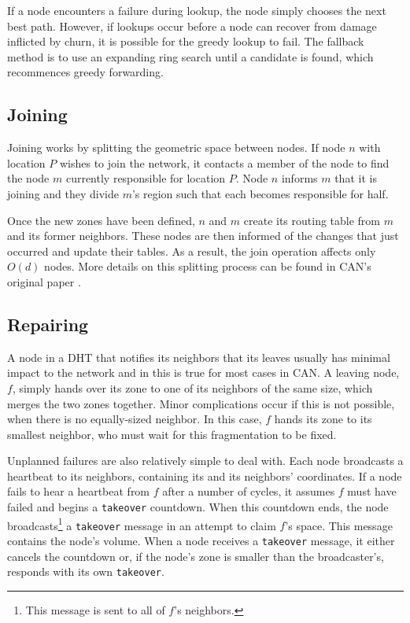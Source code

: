 If a node encounters a failure during lookup, the node simply chooses the next best path.
However, if lookups occur before a node can recover from damage inflicted by churn, it is possible for the greedy lookup to fail.
The fallback method is to use an expanding ring search until a candidate is found, which recommences greedy forwarding.

\subsection*{Joining}
Joining works by splitting the geometric space between nodes.  
If node $n$ with location $P$ wishes to join the network, it contacts a member of the node to find the node $m$ currently responsible for location $P$.
Node $n$ informs $m$ that it is joining and they divide $m$'s region such that each becomes responsible for half.

Once the new zones have been defined, $n$ and $m$ create its routing table from $m$ and its former neighbors.
These nodes are then informed of the changes that just occurred and update their tables.
As a result, the join operation affects only $O(d)$ nodes.  
More details on this splitting process can be found in CAN's original paper \cite{can}.

\subsection*{Repairing}
A node in a DHT that notifies its neighbors that its leaves usually has minimal impact to the  network and in this is true for most cases in CAN.
A leaving node, $f$, simply hands over its zone to one of its neighbors of the same size, which merges the two zones together.
Minor complications occur if this is not possible, when there is no equally-sized neighbor. 
In this case, $f$ hands its zone to its smallest neighbor, who must wait for this fragmentation to be fixed.



Unplanned failures are also relatively simple to deal with.
Each node broadcasts a heartbeat to its neighbors, containing its and its neighbors' coordinates.
If a node fails to hear a heartbeat from $f$ after a number of cycles, it assumes $f$ must have failed and begins a \texttt{takeover} countdown.
When this countdown ends, the node broadcasts\footnote{This message is sent to all of $f$'s neighbors.} a \texttt{takeover} message in an attempt to claim $f$'s space.
This message contains the node's volume.
When a node receives a \texttt{takeover} message, it either cancels the countdown or, if the node's zone is smaller than the broadcaster's, responds with its own \texttt{takeover}.

